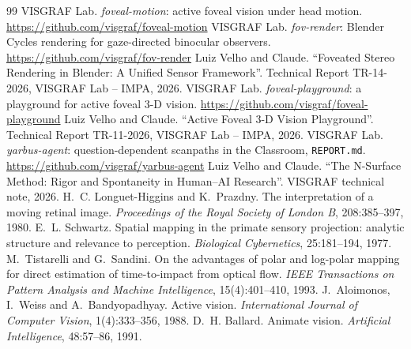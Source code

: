 \documentclass[11pt,a4paper]{article}
\newcommand{\code}[1]{\texttt{\small #1}}
\begin{document}
\begin{thebibliography}{99}
 VISGRAF Lab. \emph{foveal-motion}: active foveal vision under head motion.
  \url{https://github.com/visgraf/foveal-motion}
 VISGRAF Lab. \emph{fov-render}: Blender Cycles rendering for gaze-directed binocular observers.
  \url{https://github.com/visgraf/fov-render}
 Luiz Velho and Claude. ``Foveated Stereo Rendering in Blender: A Unified Sensor Framework''.
  Technical Report TR-14-2026, VISGRAF Lab -- IMPA, 2026.
 VISGRAF Lab. \emph{foveal-playground}: a playground for active foveal 3-D vision.
  \url{https://github.com/visgraf/foveal-playground}
 Luiz Velho and Claude. ``Active Foveal 3-D Vision Playground''. Technical Report TR-11-2026, VISGRAF
  Lab -- IMPA, 2026.
 VISGRAF Lab. \emph{yarbus-agent}: question-dependent scanpaths in the Classroom, \code{REPORT.md}.
  \url{https://github.com/visgraf/yarbus-agent}
 Luiz Velho and Claude. ``The N-Surface Method: Rigor and Spontaneity in Human--AI Research''.
  VISGRAF technical note, 2026.
 H.~C. Longuet-Higgins and K.~Prazdny. The interpretation of a moving retinal image.
  \emph{Proceedings of the Royal Society of London B}, 208:385--397, 1980.
 E.~L. Schwartz. Spatial mapping in the primate sensory projection: analytic structure and relevance
  to perception. \emph{Biological Cybernetics}, 25:181--194, 1977.
 M.~Tistarelli and G.~Sandini. On the advantages of polar and log-polar mapping for direct estimation
  of time-to-impact from optical flow. \emph{IEEE Transactions on Pattern Analysis and Machine Intelligence},
  15(4):401--410, 1993.
 J.~Aloimonos, I.~Weiss and A.~Bandyopadhyay. Active vision. \emph{International Journal of Computer
  Vision}, 1(4):333--356, 1988.
 D.~H. Ballard. Animate vision. \emph{Artificial Intelligence}, 48:57--86, 1991.
\end{thebibliography}
\end{document}
